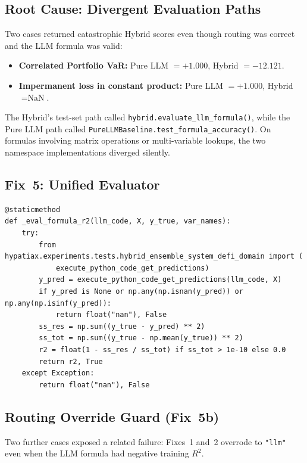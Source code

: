 \documentclass[twoside,11pt]{article}
\begin{document}
\subsection{Root Cause: Divergent Evaluation Paths}

Two cases returned catastrophic Hybrid scores even though routing was correct
and the LLM formula was valid:

\begin{itemize}[leftmargin=*]
  \item \textbf{Correlated Portfolio VaR:} Pure LLM $= +1.000$,
    Hybrid $= -12.121$.
  \item \textbf{Impermanent loss in constant product:} Pure LLM $= +1.000$,
    Hybrid $= \text{NaN}$.
\end{itemize}

The Hybrid's test-set path called \texttt{hybrid.evaluate\_llm\_formula()},
while the Pure LLM path called
\texttt{PureLLMBaseline.test\_formula\_accuracy()}.  On formulas involving
matrix operations or multi-variable lookups, the two namespace implementations
diverged silently.

\subsection{Fix~5: Unified Evaluator}

\begin{lstlisting}[caption={Unified formula evaluator (Fix~5).}]
@staticmethod
def _eval_formula_r2(llm_code, X, y_true, var_names):
    try:
        from hypatiax.experiments.tests.hybrid_ensemble_system_defi_domain import (
            execute_python_code_get_predictions)
        y_pred = execute_python_code_get_predictions(llm_code, X)
        if y_pred is None or np.any(np.isnan(y_pred)) or np.any(np.isinf(y_pred)):
            return float("nan"), False
        ss_res = np.sum((y_true - y_pred) ** 2)
        ss_tot = np.sum((y_true - np.mean(y_true)) ** 2)
        r2 = float(1 - ss_res / ss_tot) if ss_tot > 1e-10 else 0.0
        return r2, True
    except Exception:
        return float("nan"), False
\end{lstlisting}

\subsection{Routing Override Guard (Fix~5b)}

Two further cases exposed a related failure: Fixes~1 and~2 overrode to
\texttt{"llm"} even when the LLM formula had negative training $R^2$.
\end{document}
